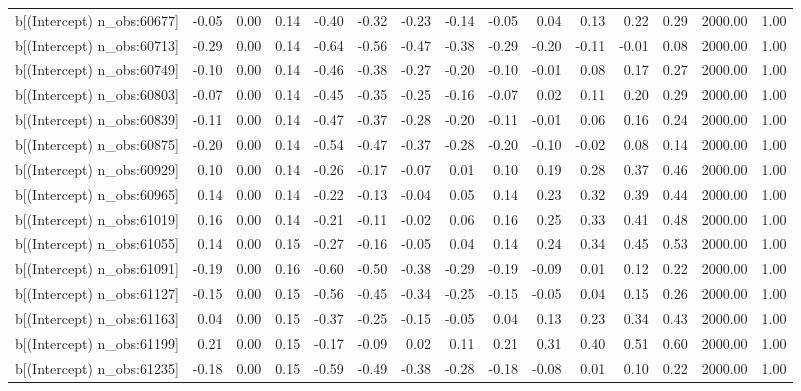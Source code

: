 \begin{table}[ht]
\begin{tabular}{rrrrrrrrrrrrrrr}
  b[(Intercept) n\_obs:60677] & -0.05 & 0.00 & 0.14 & -0.40 & -0.32 & -0.23 & -0.14 & -0.05 & 0.04 & 0.13 & 0.22 & 0.29 & 2000.00 & 1.00 \\ 
  b[(Intercept) n\_obs:60713] & -0.29 & 0.00 & 0.14 & -0.64 & -0.56 & -0.47 & -0.38 & -0.29 & -0.20 & -0.11 & -0.01 & 0.08 & 2000.00 & 1.00 \\ 
  b[(Intercept) n\_obs:60749] & -0.10 & 0.00 & 0.14 & -0.46 & -0.38 & -0.27 & -0.20 & -0.10 & -0.01 & 0.08 & 0.17 & 0.27 & 2000.00 & 1.00 \\ 
  b[(Intercept) n\_obs:60803] & -0.07 & 0.00 & 0.14 & -0.45 & -0.35 & -0.25 & -0.16 & -0.07 & 0.02 & 0.11 & 0.20 & 0.29 & 2000.00 & 1.00 \\ 
  b[(Intercept) n\_obs:60839] & -0.11 & 0.00 & 0.14 & -0.47 & -0.37 & -0.28 & -0.20 & -0.11 & -0.01 & 0.06 & 0.16 & 0.24 & 2000.00 & 1.00 \\ 
  b[(Intercept) n\_obs:60875] & -0.20 & 0.00 & 0.14 & -0.54 & -0.47 & -0.37 & -0.28 & -0.20 & -0.10 & -0.02 & 0.08 & 0.14 & 2000.00 & 1.00 \\ 
  b[(Intercept) n\_obs:60929] & 0.10 & 0.00 & 0.14 & -0.26 & -0.17 & -0.07 & 0.01 & 0.10 & 0.19 & 0.28 & 0.37 & 0.46 & 2000.00 & 1.00 \\ 
  b[(Intercept) n\_obs:60965] & 0.14 & 0.00 & 0.14 & -0.22 & -0.13 & -0.04 & 0.05 & 0.14 & 0.23 & 0.32 & 0.39 & 0.44 & 2000.00 & 1.00 \\ 
  b[(Intercept) n\_obs:61019] & 0.16 & 0.00 & 0.14 & -0.21 & -0.11 & -0.02 & 0.06 & 0.16 & 0.25 & 0.33 & 0.41 & 0.48 & 2000.00 & 1.00 \\ 
  b[(Intercept) n\_obs:61055] & 0.14 & 0.00 & 0.15 & -0.27 & -0.16 & -0.05 & 0.04 & 0.14 & 0.24 & 0.34 & 0.45 & 0.53 & 2000.00 & 1.00 \\ 
  b[(Intercept) n\_obs:61091] & -0.19 & 0.00 & 0.16 & -0.60 & -0.50 & -0.38 & -0.29 & -0.19 & -0.09 & 0.01 & 0.12 & 0.22 & 2000.00 & 1.00 \\ 
  b[(Intercept) n\_obs:61127] & -0.15 & 0.00 & 0.15 & -0.56 & -0.45 & -0.34 & -0.25 & -0.15 & -0.05 & 0.04 & 0.15 & 0.26 & 2000.00 & 1.00 \\ 
  b[(Intercept) n\_obs:61163] & 0.04 & 0.00 & 0.15 & -0.37 & -0.25 & -0.15 & -0.05 & 0.04 & 0.13 & 0.23 & 0.34 & 0.43 & 2000.00 & 1.00 \\ 
  b[(Intercept) n\_obs:61199] & 0.21 & 0.00 & 0.15 & -0.17 & -0.09 & 0.02 & 0.11 & 0.21 & 0.31 & 0.40 & 0.51 & 0.60 & 2000.00 & 1.00 \\ 
  b[(Intercept) n\_obs:61235] & -0.18 & 0.00 & 0.15 & -0.59 & -0.49 & -0.38 & -0.28 & -0.18 & -0.08 & 0.01 & 0.10 & 0.22 & 2000.00 & 1.00 \\ 

\end{tabular}
\end{table}
